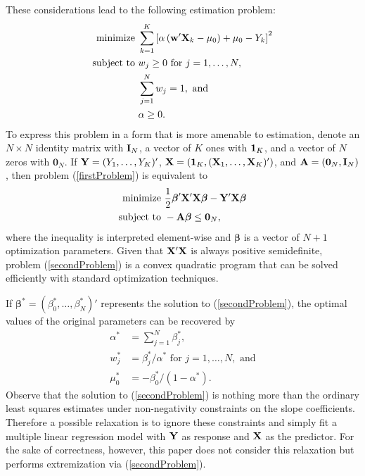 \documentclass[11pt]{article}
\theoremstyle{definition}
\theoremstyle{definition}
\def\one{{\bf 1}}
\def\w{{\bf w}}
\def\A{{\bf A}}
\def\X{{\bf X}}
\def\Y{{\bf Y}}
\def\Beta{\boldsymbol{\beta}}
\def\I{{\bf I}}
\begin{document}
These considerations lead to the following estimation problem:
\begin{align}
 \label{firstProblem}
 \begin{split}
\text{minimize } & \sum_{k=1}^K \left[ \alpha  \left(  \w'\X_{k} - \mu_0\right) + \mu_0 - Y_k \right]^2\\
\text{subject to } & w_j \geq 0 \text{ for } j = 1, \dots, N,\\
& \sum_{j=1}^N w_j = 1, \text{ and }\\
& \alpha \geq 0.
\end{split}
\end{align}
To express this problem in a form that is more amenable to estimation, denote an $N \times N$ identity matrix with $\I_N$,  a vector of $K$ ones with $\one_K$, and a vector of $N$ zeros with $\boldsymbol{0}_N$. If $\Y = (Y_1, \dots, Y_K)'$, $\X = (\one_K, (\X_1, \dots, \X_K)')$, and $\A = (\boldsymbol{0}_N, \I_N)$, then  problem (\ref{firstProblem}) is equivalent to
\begin{align}
 \label{secondProblem}
 \begin{split}
\text{minimize } & \frac{1}{2} \Beta' \X'\X \Beta - \Y'\X\Beta\\
\text{subject to } & -\A\Beta \leq \boldsymbol{0}_N,
\end{split}
\end{align}
where the inequality is interpreted element-wise and $\Beta$ is a vector of $N+1$ optimization parameters. Given that $\X'\X$ is always positive semidefinite, problem (\ref{secondProblem}) is a convex quadratic program that can be solved efficiently with standard optimization techniques. 
 
 If $\Beta^* = (\beta_0^*, \dots, \beta_{N}^*)'$ represents the solution to (\ref{secondProblem}), the optimal values of the original parameters can be recovered by
\begin{align*}
\alpha^* &= \sum_{j=1}^N \beta_j^*,\\
w_j^* &=  \beta_j^*/\alpha^* \text{ for } j = 1, \dots, N, \text{ and}\\
\mu_0^* &= -\beta_0^*/(1-\alpha^*).
\end{align*}
Observe that the solution to (\ref{secondProblem}) is nothing more than the ordinary least squares estimates under non-negativity constraints on the slope coefficients. Therefore a possible relaxation is to ignore these constraints and simply fit a multiple linear regression model with $\Y$ as response and $\X$ as the predictor. For the sake of correctness, however, this paper does not consider this relaxation but performs extremization via (\ref{secondProblem}). 
\end{document}

